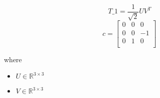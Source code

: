 \documentclass[12pt]{article}
\begin{document}
\[
\textit{T\_1} = \frac{1}{ \sqrt{2}}\textit{U}\textit{V}^T
\]
\[
\textit{c} = \begin{bmatrix}
0 & 0 & 0\\
0 & 0 & -1\\
0 & 1 & 0\\
\end{bmatrix}
\]

where
\begin{itemize}
\item $\textit{U} \in \mathbb{R}^{ 3 \times 3 }$
\item $\textit{V} \in \mathbb{R}^{ 3 \times 3 }$
\end{itemize}
\end{document}
